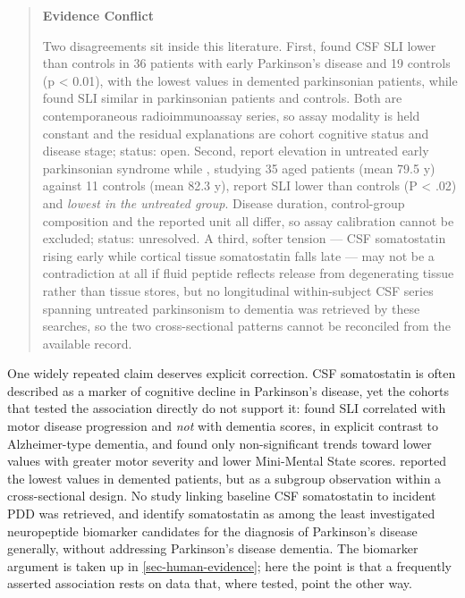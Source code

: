 \documentclass[11pt]{article}
\begin{document}
\begin{quote}
\noindent\textbf{Evidence Conflict}\par
Two disagreements sit inside this literature. First, \citet{Jolkkonen1986} found CSF SLI lower than controls in 36 patients with early Parkinson's disease and 19 controls (p < 0.01), with the lowest values in demented parkinsonian patients, while \citet{Volicer1986} found SLI similar in parkinsonian patients and controls. Both are contemporaneous radioimmunoassay series, so assay modality is held constant and the residual explanations are cohort cognitive status and disease stage; status: open. Second, \citet{Espino1995} report elevation in untreated early parkinsonian syndrome while \citet{Masson1990}, studying 35 aged patients (mean 79.5 y) against 11 controls (mean 82.3 y), report SLI lower than controls (P < .02) and \emph{lowest in the untreated group}. Disease duration, control-group composition and the reported unit all differ, so assay calibration cannot be excluded; status: unresolved. A third, softer tension --- CSF somatostatin rising early while cortical tissue somatostatin falls late \citep{Kasprzak2026,Beal1990} --- may not be a contradiction at all if fluid peptide reflects release from degenerating tissue rather than tissue stores, but no longitudinal within-subject CSF series spanning untreated parkinsonism to dementia was retrieved by these searches, so the two cross-sectional patterns cannot be reconciled from the available record.

\end{quote}

One widely repeated claim deserves explicit correction. CSF somatostatin is often described as a marker of cognitive decline in Parkinson's disease, yet the cohorts that tested the association directly do not support it: \citet{Strittmatter1992} found SLI correlated with motor disease progression and \emph{not} with dementia scores, in explicit contrast to Alzheimer-type dementia, and \citet{Masson1990} found only non-significant trends toward lower values with greater motor severity and lower Mini-Mental State scores. \citet{Jolkkonen1986} reported the lowest values in demented patients, but as a subgroup observation within a cross-sectional design. No study linking baseline CSF somatostatin to incident PDD was retrieved, and \citet{Thakur2025} identify somatostatin as among the least investigated neuropeptide biomarker candidates for the diagnosis of Parkinson's disease generally, without addressing Parkinson's disease dementia. The biomarker argument is taken up in \ref{sec-human-evidence}; here the point is that a frequently asserted association rests on data that, where tested, point the other way.
\end{document}
